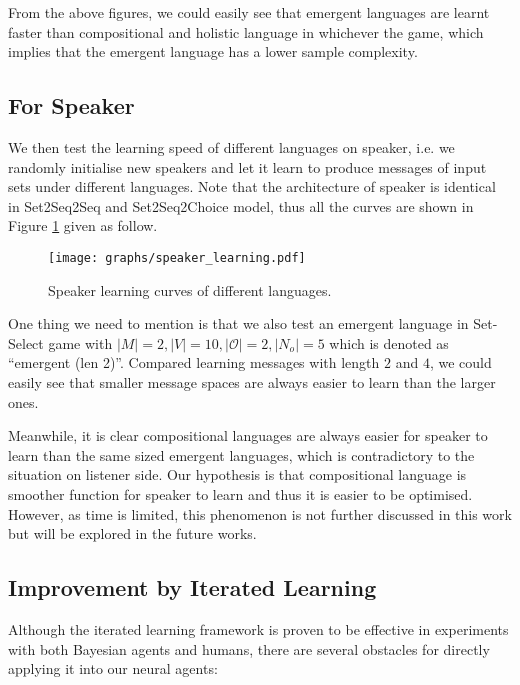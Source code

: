 From the above figures, we could easily see that emergent languages are learnt faster than compositional and holistic language in whichever the game, which implies that the emergent language has a lower sample complexity\cite{vapnik2013nature}.

\subsection{For Speaker}
\label{ssec4.3.2:learning_speaker}

We then test the learning speed of different languages on speaker, i.e. we randomly initialise new speakers and let it learn to produce messages of input sets under different languages. Note that the architecture of speaker is identical in Set2Seq2Seq and Set2Seq2Choice model, thus all the curves are shown in Figure \ref{fig4.3:speaker_learning} given as follow.

\begin{figure}[!h]
    \centering
    \texttt{[image: graphs/speaker\_learning.pdf]}
    \caption{Speaker learning curves of different languages.}
    \label{fig4.3:speaker_learning}
\end{figure}

One thing we need to mention is that we also test an emergent language in Set-Select game with $|M|=2, |V|=10, |\mathcal{O}|=2, |N_o|=5$ which is denoted as ``emergent (len 2)''. Compared learning messages with length $2$ and $4$, we could easily see that smaller message spaces are always easier to learn than the larger ones.

Meanwhile, it is clear compositional languages are always easier for speaker to learn than the same sized emergent languages, which is contradictory to the situation on listener side. Our hypothesis is that compositional language is smoother function for speaker to learn and thus it is easier to be optimised. However, as time is limited, this phenomenon is not further discussed in this work but will be explored in the future works.

\subsection{Improvement by Iterated Learning}
\label{ssec4.3.:iterated_learning_improve}

Although the iterated learning framework \cite{kirby2002emergence} is proven to be effective in experiments with both Bayesian agents and humans, there are several obstacles for directly applying it into our neural agents:

